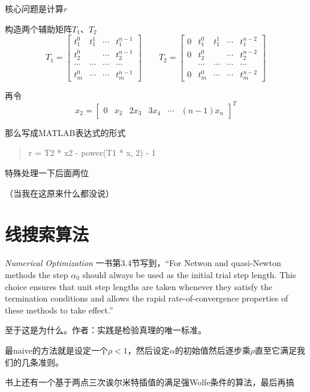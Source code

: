 \documentclass[a4paper, 11pt]{article}
\begin{document}
核心问题是计算$r$

构造两个辅助矩阵$T_1$、$T_2$
\begin{equation*}
T_1=
\begin{bmatrix}
t_1^0 & t_1^1 & \cdots & t_1^{n-1}\\
t_2^0 & & \cdots & t_2^{n-1}\\
\cdots & \cdots &\cdots & \cdots\\
t_m^0 & \cdots &\cdots & t_m^{n-1}
\end{bmatrix}
\qquad 
T_2=
\begin{bmatrix}
0 & t_1^0 & t_1^1 & \cdots & t_1^{n-2}\\
0 & t_2^0 & & \cdots & t_2^{n-2}\\
  & \cdots & \cdots &\cdots & \cdots\\
0 & t_m^0 & \cdots &\cdots & t_m^{n-2}
\end{bmatrix}
\end{equation*}

再令
\begin{equation*}
x_2=
\begin{bmatrix}
	0 & x_2 & 2x_3 & 3x_4 &\cdots & (n-1)x_n
\end{bmatrix}^T
\end{equation*}

那么写成MATLAB表达式的形式
\begin{verse}
	r = T2 * x2 - power(T1 * x, 2) - 1
\end{verse}

特殊处理一下后面两位

（当我在这原来什么都没说）

\section{线搜索算法}

\textit{Numerical Optimization} 一书第3.4节写到，``For Netwon and quasi-Newton methods the step $\alpha_0$ should always be used as the initial trial step length. This choice ensures that unit step lengths are taken whenever they satisfy the termination conditions and allows the rapid rate-of-convergence properties of these methods to take effect.''

至于这是为什么。作者：实践是检验真理的唯一标准。

最naive的方法就是设定一个$\rho<1$，然后设定$\alpha$的初始值然后逐步乘$\rho$直至它满足我们的几条准则。

书上还有一个基于两点三次诶尔米特插值的满足强Wolfe条件的算法，最后再搞
\end{document}

